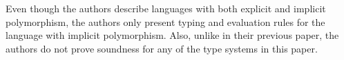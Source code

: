 \documentclass[letterpaper]{llncs}
\begin{document}
Even though the authors describe languages with both explicit and implicit polymorphism, the authors only present typing and evaluation rules for the language with implicit polymorphism. Also, unlike in their previous paper, the authors do not prove soundness for any of the type systems in this paper.


%
%
\end{document}
